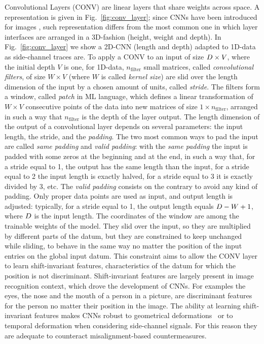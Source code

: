 Convolutional Layers (CONV) are linear layers that share weights across space. A representation is given in Fig.~\ref{fig:conv_layer}; since CNNs have been introduced for images \cite{lecun1995convolutional}, such representation differs from the most common one in which layer interfaces are arranged in a 3D-fashion (height, weight and depth). In Fig.~\ref{fig:conv_layer} we show a 2D-CNN (length and depth) adapted to 1D-data as side-channel traces are. To apply a CONV to an input of size $D\times V$, where the initial depth $V$ is one, for 1D-data,
$n_{\text{filter}}$ small matrices, called \emph{convolutional filters}, of
size $W\times V$ (where $W$ is called \emph{kernel size}) are slid over 
the length dimension of the input by a chosen amount of units, called \emph{stride}. 
The filters form a window, called \emph{patch} in ML language, which defines a
linear transformation of $W\times V$ consecutive points of the data into new
matrices of size $1\times n_{\text{filter}}$, arranged in such a way that $n_{\text{filter}}$ is the depth of the layer output. The length dimension of the output of a convolutional layer depends on several parameters: the input length, the stride, and the \emph{padding}. The two most common ways to pad the input are called \emph{same padding} and \emph{valid padding}: with the \emph{same padding} the input is padded with some zeros at the beginning and at the end, in such a way that, for a stride equal to 1, the output has the same
length than the input, for a stride equal to 2 the input length is exactly halved, for a stride equal to 3 it is exactly divided by 3, etc.  The \emph{valid padding} consists on the contrary to avoid any kind of padding. Only proper data points are used as input, and output length is adjusted: typically, for a stride equal to 1, the output length equals $D - W +1$, where $D$ is the input length. The
coordinates of the window are among the trainable weights of the model. They slid over the input, so they are multiplied by different parts of the datum, but  they are constrained to keep unchanged while sliding, \ie to behave in the same way no matter the position of the input entries on the global input datum. This constraint aims to allow the CONV layer to
learn shift-invariant features, \ie characteristics of the datum for which the position is not discriminant. Shift-invariant features are largely present in image recognition context, which drove the development of CNNs. For examples the eyes, the nose and the mouth of a person in a picture, are discriminant features for the person no matter their position in the image. The ability at learning shift-invariant features makes CNNs robust to
geometrical deformations~\cite{lecun1995convolutional} or to temporal deformation when considering side-channel signals. For this reason they are adequate to counteract misalignment-based countermeasures.


